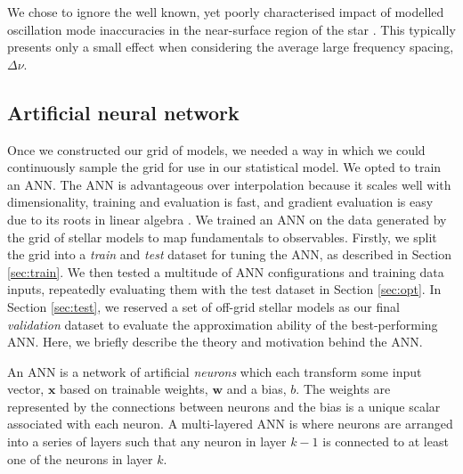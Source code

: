 \documentclass[a4paper,fleqn,usenatbib]{mnras}
\newcommand{\dnu}{\ensuremath{\Delta\nu}}
\begin{document}
We chose to ignore the well known, yet poorly characterised impact of modelled oscillation mode inaccuracies in the near-surface region of the star \citep{Kjeldsen.Bedding.ea2008, Ball.Gizon2014, Sonoi.Samadi.ea2015}. This typically presents only a small effect when considering the average large frequency spacing, $\dnu$. %

\subsection{Artificial neural network}\label{sec:ann}

Once we constructed our grid of models, we needed a way in which we could continuously sample the grid for use in our statistical model. We opted to train an ANN. The ANN is advantageous over interpolation because it scales well with dimensionality, training and evaluation is fast, and gradient evaluation is easy due to its roots in linear algebra \citep{Haykin2007}. We trained an ANN on the data generated by the grid of stellar models to map fundamentals to observables. Firstly, we split the grid into a \emph{train} and \emph{test} dataset for tuning the ANN, as described in Section \ref{sec:train}. We then tested a multitude of ANN configurations and training data inputs, repeatedly evaluating them with the test dataset in Section \ref{sec:opt}. In Section \ref{sec:test}, we reserved a set of off-grid stellar models as our final \emph{validation} dataset to evaluate the approximation ability of the best-performing ANN. Here, we briefly describe the theory and motivation behind the ANN.

An ANN is a network of artificial \emph{neurons} which each transform some input vector, $\boldsymbol{x}$ based on trainable weights, $\boldsymbol{w}$ and a bias, $b$. The weights are represented by the connections between neurons and the bias is a unique scalar associated with each neuron. A multi-layered ANN is where neurons are arranged into a series of layers such that any neuron in layer $k-1$ is connected to at least one of the neurons in layer $k$. 
\end{document}
